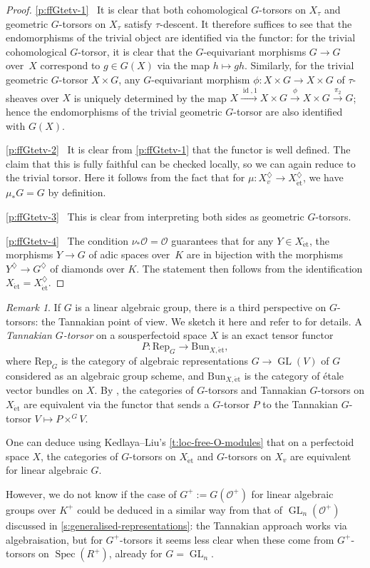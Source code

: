 \documentclass[10pt,a4paper]{article}
\theoremstyle{definition}
\theoremstyle{remark}
\newtheorem{Remark}[thm]{Remark}
\newcommand{\lra}{\longrightarrow}
\renewcommand{\O}{\mathcal{O}}
\newcommand{\GL}{\operatorname{GL}}
\newcommand{\Spec}{\operatorname{Spec}}
\newcommand{\id}{{\operatorname{id}}}
\newcommand{\et}{{\operatorname{\acute{e}t}}}
\newcommand{\Rep}{\mathrm{Rep}}
\numberwithin{equation}{section}
\begin{document}
\begin{proof}
  \eqref{p:ffGtetv-1}~ It is clear that both cohomological $G$-torsors on $X_{\tau}$ and geometric $G$-torsors  on $X_{\tau}$ satisfy $\tau$-descent. It therefore suffices to see  that the endomorphisms of the trivial object are identified via the functor: for the trivial cohomological $G$-torsor, it is clear that the $G$-equivariant morphisms $G\to G$ over~$X$ correspond to $g\in G(X)$ via the map $h\mapsto gh$. Similarly, for the trivial geometric $G$-torsor $X\times G$, any $G$-equivariant morphism $\phi\colon X\times G\to X\times G$ of $\tau$-sheaves over $X$ is uniquely determined by the map $X\xrightarrow{\id,1}X\times G\xrightarrow{\phi} X\times G\xrightarrow{\pi_2} G$; hence the endomorphisms of the trivial geometric $G$-torsor are also identified with $G(X)$.
  
\eqref{p:ffGtetv-2}~  It is clear from \eqref{p:ffGtetv-1} that the functor is well defined. The claim that this is fully faithful can be checked locally, so we can again reduce to the trivial torsor. Here it follows from the fact that for $\mu\colon X_v^\diamondsuit\to  X_\et^{\diamondsuit}$, we have $\mu_{\ast}G=G$ by definition.

\eqref{p:ffGtetv-3}~ This is clear from interpreting both sides as geometric $G$-torsors.

\eqref{p:ffGtetv-4}~ The condition $\nu_{\ast}\O=\O$ guarantees that for any $Y\in X_\et$, the morphisms $Y\to G$ of adic spaces over~$K$ are in bijection with the morphisms $Y^\diamondsuit\to G^\diamondsuit$ of diamonds over $K$. The statement then follows from the identification $X_\et=X_\et^\diamondsuit$.
\end{proof}


\begin{Remark}
	If $G$ is a linear algebraic group, there is a third perspective on $G$-torsors: the Tannakian point of view. We sketch it here and refer to \cite[Appendix to Lecture 19]{ScholzeBerkeleyLectureNotes} for details. A \emph{Tannakian $G$-torsor} on a sousperfectoid space $X$ is an exact tensor functor 
	\[P\colon\Rep_G\lra \mathrm{Bun}_{X,\et},\]
	 where $\Rep_G$ is the category of algebraic representations $G\to \GL(V)$ of $G$ considered as an algebraic group scheme, and $\mathrm{Bun}_{X,\et}$ is the category of \'etale vector bundles on $X$. By \cite[Theorem 19.5.1]{ScholzeBerkeleyLectureNotes}, the categories of $G$-torsors  and Tannakian $G$-torsors on $X_{\et}$ are equivalent via the functor that sends a $G$-torsor $P$ to the Tannakian $G$-torsor  $V\mapsto P\times^GV$.
	 
	 One can deduce using Kedlaya--Liu's \cref{t:loc-free-O-modules} that on a perfectoid space $X$, the categories of $G$-torsors on $X_{\et}$ and $G$-torsors on $X_{v}$ are equivalent for linear algebraic $G$.
	 
	 However, we do not know if the case of $G^+:=G(\O^+)$ for linear algebraic groups over $K^+$ could be deduced in a similar way from that of $\GL_n(\O^+)$ discussed in \cref{s:generalised-representations}:  the Tannakian approach works via algebraisation, but for $G^+$-torsors it seems less clear when these come from $G^+$-torsors on $\Spec(R^+)$, already for $G=\GL_n$.
\end{Remark}
\end{document}
